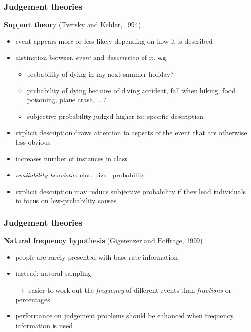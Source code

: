 \documentclass[]{beamer}
\begin{document}
\begin{frame}
 \frametitle{Judgement theories}
\begin{overlayarea}{110mm}{80mm}
 \textbf{Support theory} (Tversky and Kohler, 1994)
\begin{itemize}
 \item event appears more or less likely depending on how it is described
 \item<2->[$\rightarrow$] distinction between \textit{event} and \textit{description} of it, e.g.
 \begin{itemize}
  \item<3-> probability of dying in my next summer holiday?
  \item<3-> probability of dying because of diving accident, fall when hiking, food poisoning, plane crash, ...?
  \item<3->[$\Rightarrow$] subjective probability judged higher for specific description
 \end{itemize}
 \item<4-> explicit description draws attention to aspects of the event that are otherwise less obvious 
 \item<4->[$\rightarrow$] increases number of instances in class 
 \item<4->[$\rightarrow$]  \textit{availability heuristic:} class size $~$ probability
 \item[]
 \item<5->[!] explicit description may reduce subjective probability if they lead individuals to focus on low-probability causes
\end{itemize}
\end{overlayarea}
\end{frame}



\begin{frame}
 \frametitle{Judgement theories}
\begin{overlayarea}{110mm}{80mm}
 \textbf{Natural frequency hypothesis} (Gigerenzer and Hoffrage, 1999)
\begin{itemize}
 \item people are rarely presented with base-rate information
 \item instead: natural sampling
 \item[$\rightarrow$] easier to work out the \textit{frequency} of different events than \textit{fractions} or percentages
 \item<2->[$\rightarrow$] performance on judgement problems should be enhanced when frequency information is used
\end{itemize}
\end{overlayarea}
\end{frame}
\end{document}
